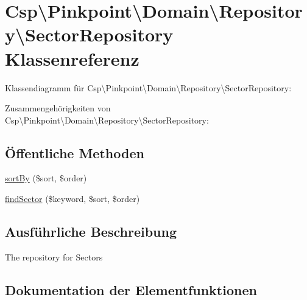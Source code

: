 \hypertarget{classCsp_1_1Pinkpoint_1_1Domain_1_1Repository_1_1SectorRepository}{}\section{Csp\textbackslash{}Pinkpoint\textbackslash{}Domain\textbackslash{}Repository\textbackslash{}Sector\+Repository Klassenreferenz}
\label{classCsp_1_1Pinkpoint_1_1Domain_1_1Repository_1_1SectorRepository}


Klassendiagramm für Csp\textbackslash{}Pinkpoint\textbackslash{}Domain\textbackslash{}Repository\textbackslash{}Sector\+Repository\+:


Zusammengehörigkeiten von Csp\textbackslash{}Pinkpoint\textbackslash{}Domain\textbackslash{}Repository\textbackslash{}Sector\+Repository\+:
\subsection*{Öffentliche Methoden}
\begin{DoxyCompactItemize}
\item 
\hyperlink{classCsp_1_1Pinkpoint_1_1Domain_1_1Repository_1_1SectorRepository_a94583892a34d36f3575933b084224926}{sort\+By} (\$sort, \$order)
\item 
\hyperlink{classCsp_1_1Pinkpoint_1_1Domain_1_1Repository_1_1SectorRepository_ade3884b7eaad8ee974b0c34f2010369f}{find\+Sector} (\$keyword, \$sort, \$order)
\end{DoxyCompactItemize}


\subsection{Ausführliche Beschreibung}
The repository for Sectors 

\subsection{Dokumentation der Elementfunktionen}
\mbox{\label{classCsp_1_1Pinkpoint_1_1Domain_1_1Repository_1_1SectorRepository_ade3884b7eaad8ee974b0c34f2010369f}} 
